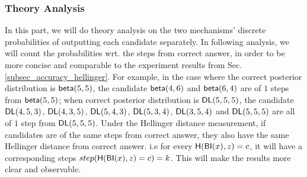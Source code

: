 \subsubsection{Theory Analysis}
In this part, we will do theory analysis on the two mechanisms' discrete probabilities of outputting each candidate separately. In following analysis, we will count the probabilities wrt. the steps from correct answer, in order to be more concise and comparable to the experiment results from Sec. \ref{subsec_accuracy_hellinger}. For example, in the case where the correct posterior distribution is $\mathsf{beta}(5,5)$, the candidate $\mathsf{beta}(4,6)$ and $\mathsf{beta}(6,4)$ are of $1$ steps from $\mathsf{beta}(5,5)$; when correct posterior distribution is $\mathsf{DL}(5,5,5)$, the candidate $\mathsf{DL}(4,5,3)$, $\mathsf{DL}(4,3,5)$, $\mathsf{DL}(5,4,3)$, $\mathsf{DL}(5,3,4)$, $\mathsf{DL}(3,5,4)$ and $\mathsf{DL}(5,5,5)$ are all of $1$ step from $\mathsf{DL}(5,5,5)$. Under the Hellinger distance measurement, if candidates are of the same steps from correct answer, they also have the same Hellinger distance from correct answer. i.e for every $\mathsf{H}(\mathsf{BI}(x), z) = c$, it will have a corresponding steps $step(\mathsf{H}(\mathsf{BI}(x), z) = c) = k$. This will make the results more clear and observable.


